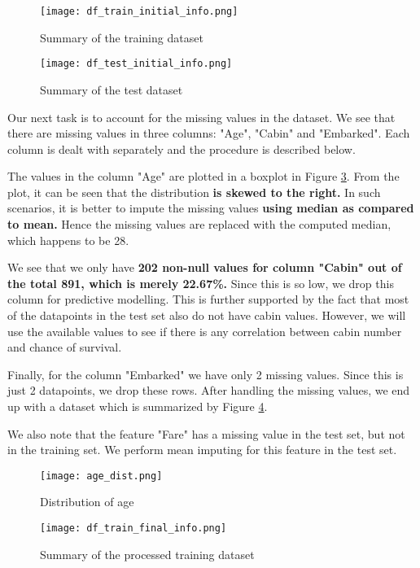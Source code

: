 \documentclass[conference]{IEEEtran}
\begin{document}
\begin{figure}[tbh]
\centering
\texttt{[image: df\_train\_initial\_info.png]}
\caption{Summary of the training dataset}
\label{df_train_initial_info}
\end{figure}

\begin{figure}[tbh]
\centering
\texttt{[image: df\_test\_initial\_info.png]}
\caption{Summary of the test dataset}
\label{df_test_initial_info}
\end{figure}

Our next task is to account for the missing values in the dataset. We see that there are missing values in three columns: "Age", "Cabin" and "Embarked". Each column is dealt with separately and the procedure is described below.

The values in the column "Age" are plotted in a boxplot in Figure \ref{age_dist}. From the plot, it can be seen that the distribution \textbf{is skewed to the right.} In such scenarios, it is better to impute the missing values \textbf{using median as compared to mean.} Hence the missing values are replaced with the computed median, which happens to be 28. 

We see that we only have \textbf{202 non-null values for column "Cabin" out of the total 891, which is merely 22.67\%.} Since this is so low, we drop this column for predictive modelling. This is further supported by the fact that most of the datapoints in the test set also  do not have cabin values. However, we will use the available values to see if there is any correlation between cabin number and chance of survival.

Finally, for the column "Embarked" we have only 2 missing values. Since this is just 2 datapoints, we drop these rows. After handling the missing values, we end up with a dataset which is summarized by Figure \ref{df_train_final_info}.

We also note that the feature "Fare" has a missing value in the test set, but not in the training set. We perform mean imputing for this feature in the test set.



\begin{figure}[tbh]
\centering
\texttt{[image: age\_dist.png]}
\caption{Distribution of age}
\label{age_dist}
\end{figure}

\begin{figure}[tbh]
\centering
\texttt{[image: df\_train\_final\_info.png]}
\caption{Summary of the processed training dataset}
\label{df_train_final_info}
\end{figure}
\end{document}
